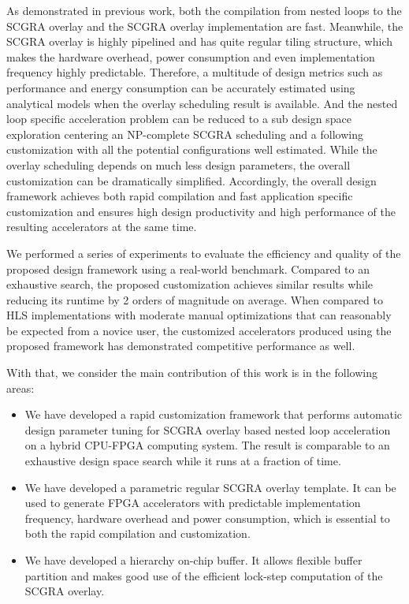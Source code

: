 As demonstrated in previous work, both the compilation from nested 
loops to the SCGRA overlay \cite{scgra} and the SCGRA overlay 
implementation \cite{ROB2014} are fast. Meanwhile, the SCGRA 
overlay is highly pipelined and has quite regular tiling structure, 
which makes the hardware overhead, power consumption and even implementation frequency 
highly predictable. Therefore, a multitude of design metrics such as performance 
and energy consumption can be accurately estimated using analytical models when the 
overlay scheduling result is available. And the nested loop specific acceleration problem can be 
reduced to a sub design space exploration centering an NP-complete SCGRA scheduling and 
a following customization with all the potential configurations well estimated. 
While the overlay scheduling depends on much less design parameters, the overall 
customization can be dramatically simplified. Accordingly, the overall design 
framework achieves both rapid compilation and fast application specific 
customization and ensures high design productivity and high performance of the resulting
accelerators at the same time.  

We performed a series of experiments to evaluate the efficiency 
and quality of the proposed design framework using a real-world 
benchmark. Compared to an exhaustive search, the proposed 
customization achieves similar results while reducing its 
runtime by 2 orders of magnitude on average. When compared to 
HLS implementations with moderate manual optimizations that can 
reasonably be expected from a novice user,  
the customized accelerators produced using the proposed framework 
has demonstrated competitive performance as well. 

With that, we consider the main contribution of this work is in the following areas:
\begin{itemize}[nosep]
\item We have developed a rapid customization framework that 
    performs automatic design parameter tuning for SCGRA overlay based 
    nested loop acceleration on a hybrid CPU-FPGA computing system. 
    The result is comparable to an exhaustive design space search while 
    it runs at a fraction of time.
\item We have developed a parametric regular SCGRA overlay template. It can be used 
    to generate FPGA accelerators with predictable implementation 
    frequency, hardware overhead and power consumption, which is essential to 
    both the rapid compilation and customization.
\item We have developed a hierarchy on-chip buffer. It allows flexible 
    buffer partition and makes good use of the efficient lock-step computation 
    of the SCGRA overlay.
\end{itemize}

